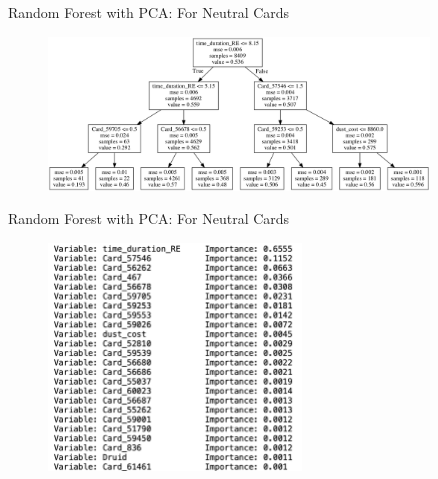 \documentclass[12pt]{beamer}
\begin{document}
\begin{frame}[fragile]{Random Forest with PCA: For Neutral Cards}

	\begin{figure}
		\begin{center}
			\includegraphics[width=0.9\textwidth]{figure/plot/3a.png}
		\end{center}
	\end{figure}

\end{frame}

\begin{frame}[fragile]{Random Forest with PCA: For Neutral Cards}

	\begin{figure}
		\begin{center}
			\includegraphics[width=0.6\textwidth]{figure/plot/3a_importance.png}
		\end{center}
	\end{figure}

\end{frame}
\end{document}
